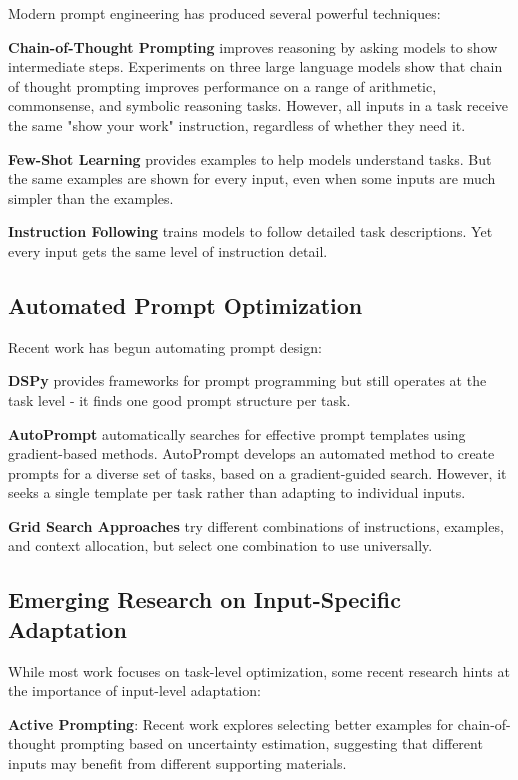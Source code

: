\documentclass[11pt,a4paper]{article}
\begin{document}
Modern prompt engineering has produced several powerful techniques:

\textbf{Chain-of-Thought Prompting} \citep{wei2022chain} improves reasoning by asking models to show intermediate steps. Experiments on three large language models show that chain of thought prompting improves performance on a range of arithmetic, commonsense, and symbolic reasoning tasks. However, all inputs in a task receive the same "show your work" instruction, regardless of whether they need it.

\textbf{Few-Shot Learning} provides examples to help models understand tasks. But the same examples are shown for every input, even when some inputs are much simpler than the examples.

\textbf{Instruction Following} trains models to follow detailed task descriptions. Yet every input gets the same level of instruction detail.

\subsection{Automated Prompt Optimization}

Recent work has begun automating prompt design:

\textbf{DSPy} \citep{khattab2023dspy} provides frameworks for prompt programming but still operates at the task level - it finds one good prompt structure per task.

\textbf{AutoPrompt} \citep{shin2020autoprompt} automatically searches for effective prompt templates using gradient-based methods. AutoPrompt develops an automated method to create prompts for a diverse set of tasks, based on a gradient-guided search. However, it seeks a single template per task rather than adapting to individual inputs.

\textbf{Grid Search Approaches} try different combinations of instructions, examples, and context allocation, but select one combination to use universally.

\subsection{Emerging Research on Input-Specific Adaptation}

While most work focuses on task-level optimization, some recent research hints at the importance of input-level adaptation:

\textbf{Active Prompting}: Recent work explores selecting better examples for chain-of-thought prompting based on uncertainty estimation, suggesting that different inputs may benefit from different supporting materials.
\end{document}
